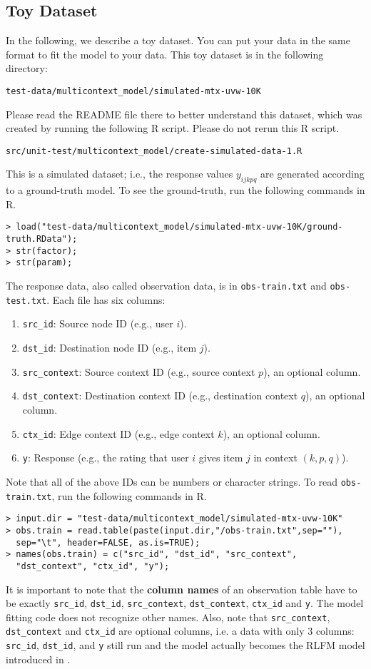 \documentclass[10pt]{article}
\newcommand{\parahead}[1]{\vspace{0.15in}\noindent{\bf #1:}}
\begin{document}
\subsection{Toy Dataset}

In the following, we describe a toy dataset.  You can put your data in the same format to fit the model to your data.  This toy dataset is in the following directory:
\begin{verbatim}
test-data/multicontext_model/simulated-mtx-uvw-10K
\end{verbatim}
Please read the README file there to better understand this dataset, which was created by running the following R script.  Please do not rerun this R script.
\begin{verbatim}
src/unit-test/multicontext_model/create-simulated-data-1.R
\end{verbatim}
This is a simulated dataset; i.e., the response values $y_{ijkpq}$ are generated according to a ground-truth model.  To see the ground-truth, run the following commands in R.
{\small
\begin{verbatim}
> load("test-data/multicontext_model/simulated-mtx-uvw-10K/ground-truth.RData");
> str(factor);
> str(param);
\end{verbatim}
}

\parahead{Response Data}
The response data, also called observation data, is in {\tt obs-train.txt} and {\tt obs-test.txt}.  Each file has six columns:
\begin{enumerate}
\item {\tt src\_id}: Source node ID (e.g., user $i$).
\item {\tt dst\_id}: Destination node ID (e.g., item $j$).
\item {\tt src\_context}: Source context ID (e.g., source context $p$), an optional column.
\item {\tt dst\_context}: Destination context ID (e.g., destination context $q$), an optional column.
\item {\tt ctx\_id}: Edge context ID (e.g., edge context $k$), an optional column.
\item {\tt y}: Response (e.g., the rating that user $i$ gives item $j$ in context $(k,p,q)$).
\end{enumerate}
Note that all of the above IDs can be numbers or character strings.
To read {\tt obs-train.txt}, run the following commands in R.
{\small
\begin{verbatim}
> input.dir = "test-data/multicontext_model/simulated-mtx-uvw-10K"
> obs.train = read.table(paste(input.dir,"/obs-train.txt",sep=""),
  sep="\t", header=FALSE, as.is=TRUE);
> names(obs.train) = c("src_id", "dst_id", "src_context", 
  "dst_context", "ctx_id", "y");
\end{verbatim}
}
It is important to note that the {\bf column names} of an observation table have to be exactly {\tt src\_id}, {\tt dst\_id}, {\tt src\_context}, {\tt dst\_context}, {\tt ctx\_id} and {\tt y}. The model fitting code does not recognize other names. Also, note that {\tt src\_context}, {\tt dst\_context} and {\tt ctx\_id} are optional columns, i.e. a data with only 3 columns: {\tt src\_id}, {\tt dst\_id}, and {\tt y} still run and the model actually becomes the RLFM model introduced in \cite{rlfm:kdd09}. 
\end{document}
